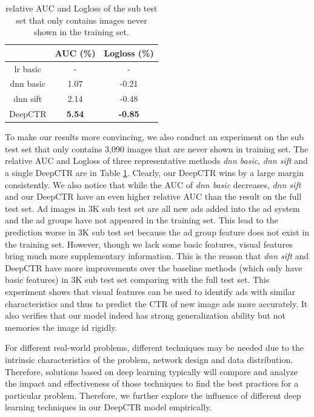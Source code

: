 \documentclass{sig-alternate-05-2015}
\begin{document}
\begin{table}
	\centering
	\caption{relative AUC and Logloss of the sub test set that only contains images never shown in the training set.}
	\label{table:subset}
	\begin{tabular}{|c|c|c|} \hline
		& AUC (\%) & Logloss (\%)\\ \hline
		lr basic & - & - \\ \hline
		dnn basic & 1.07 & -0.21 \\ \hline
		dnn sift & 2.14 & -0.48  \\ \hline
		DeepCTR & \textbf{5.54} & \textbf{-0.85} \\ \hline
	\end{tabular}
\end{table}
To make our results more convincing, we also conduct an experiment on the sub test set that only contains 3,090 images that are never shown in training set. The relative AUC and Logloss of three representative methods \emph{dnn basic}, \emph{dnn sift} and a single DeepCTR are in Table \ref{table:subset}. Clearly, our DeepCTR wins by a large margin consistently. We also notice that while the AUC of \emph{dnn basic} decreases, \emph{dnn sift} and our DeepCTR have an even higher relative AUC than the result on the full test set. 
Ad images in 3K sub test set are all new ads added into the ad system and the ad groups have not appeared in the training set. This lead to the prediction worse in 3K sub test set because the ad group feature does not exist in the training set. However, though we lack some basic features, visual features bring much more supplementary information. This is the reason that \emph{dnn sift} and DeepCTR have more improvements over the baseline methods (which only have basic features) in 3K sub test set comparing with the full test set.
This experiment shows that visual features can be used to identify ads with similar characteristics and thus to predict the CTR of new image ads  more accurately.   It also verifies that our model indeed has strong generalization ability but not  memories the image id rigidly.   


For different real-world problems, different techniques may be needed due to the intrinsic characteristics of the problem, network design and data distribution. Therefore, solutions based on deep learning typically will compare and analyze the impact and effectiveness of those techniques to find the best practices for a particular problem. Therefore,
we further  explore the influence of different deep learning techniques in our DeepCTR model empirically. 
\end{document}
